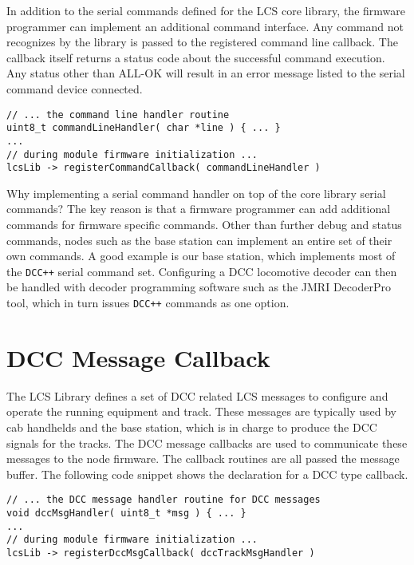 In addition to the serial commands defined for the LCS  core library, the firmware programmer can implement an additional command interface. Any command not recognizes by the library is passed to the registered command line callback. The callback itself returns a status code about the successful command execution. Any status other than ALL-OK will result in an error message listed to the serial command device connected.

\lstset{style=codesnippetstyle}
\begin{lstlisting}
// ... the command line handler routine
uint8_t commandLineHandler( char *line ) { ... }
...
// during module firmware initialization ...
lcsLib -> registerCommandCallback( commandLineHandler )
\end{lstlisting}

Why implementing a serial command handler on top of the core library serial commands? The key reason is that a firmware programmer can add additional commands for firmware specific commands. Other than further debug and status commands, nodes such as the base station can implement an entire set of their own commands. A good example is our base station, which implements most of the \texttt{DCC++} serial command set. Configuring a DCC locomotive decoder can then be handled with decoder programming software such as the JMRI DecoderPro tool, which in turn issues \texttt{DCC++} commands as one option.

\section{DCC Message Callback}

The LCS Library defines a set of DCC related LCS messages to configure and operate the running equipment and track. These messages are typically used by cab handhelds and the base station, which is in charge to produce the DCC signals for the tracks. The DCC message callbacks are used to communicate these messages to the node firmware. The callback routines are all passed the message buffer. The following code snippet shows the declaration for a DCC type callback.

\lstset{style=codesnippetstyle}
\begin{lstlisting}
// ... the DCC message handler routine for DCC messages
void dccMsgHandler( uint8_t *msg ) { ... }
...
// during module firmware initialization ...
lcsLib -> registerDccMsgCallback( dccTrackMsgHandler )
\end{lstlisting}

